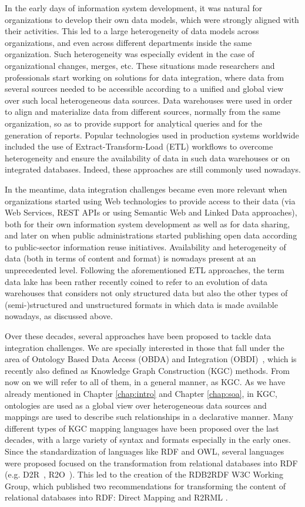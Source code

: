 In the early days of information system development, it was natural for organizations to develop their own data models, which were strongly aligned with their activities. This led to a large heterogeneity of data models across organizations, and even across different departments inside the same organization. Such heterogeneity was especially evident in the case of organizational changes, merges, etc. These situations made researchers and professionals start working on solutions for data integration, where data from several sources needed to be accessible according to a unified and global view over such local heterogeneous data sources. Data warehouses were used in order to align and materialize data from different sources, normally from the same organization, so as to provide support for analytical queries and for the generation of reports. Popular technologies used in production systems worldwide included the use of Extract-Transform-Load (ETL) workflows to overcome heterogeneity and ensure the availability of data in such data warehouses or on integrated databases. Indeed, these approaches are still commonly used nowadays.

In the meantime, data integration challenges became even more relevant when organizations started using Web technologies to provide access to their data (via Web Services, REST APIs or using Semantic Web and Linked Data approaches), both for their own information system development as well as for data sharing, and later on when public administrations started publishing open data according to  public-sector information reuse initiatives. Availability and heterogeneity of data (both in terms of content and format) is nowadays present at an unprecedented level. Following the aforementioned ETL approaches, the term data lake has been rather recently coined to refer to an evolution of data warehouses that considers not only structured data but also the other types of (semi-)structured and unstructured formats in which data is made available nowadays, as discussed above.

Over these decades, several approaches have been proposed to tackle data integration challenges. We are specially interested in those that fall under the area of Ontology Based Data Access (OBDA) and Integration (OBDI)~\citep{poggi2008linking}, which is recently also defined as Knowledge Graph Construction (KGC) methods. From now on we will refer to all of them, in a general manner, as KGC. As we have already mentioned in Chapter \ref{chap:intro} and Chapter \ref{chap:soa}, in KGC, ontologies are used as a global view over heterogeneous data sources and mappings are used to describe such relationships in a declarative manner. Many different types of KGC mapping languages have been proposed over the last decades, with a large variety of syntax and formats especially in the early ones. Since the standardization of languages like RDF and OWL, several languages were proposed focused on the transformation from relational databases into RDF (e.g. D2R~\citep{bizer2004d2rq}, R2O~\citep{barrasa2004r2o}). This led to the creation of the RDB2RDF W3C Working Group, which published two recommendations for transforming the content of relational databases into RDF: Direct Mapping \citep{arenas2013direct} and R2RML \citep{R2RML}.


